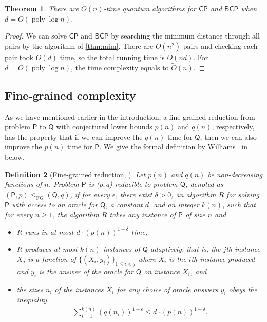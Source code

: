 \documentclass[10pt,a4paper]{article}
\newtheorem{theorem}{Theorem}
\newtheorem{definition}[theorem]{Definition}
\newcommand{\wt}{\widetilde}
\renewcommand{\tilde}{\wt}
\DeclareMathOperator{\poly}{poly}
\newcommand{\FG}{\mathrm{FG}}
\newcommand{\CP}{\ensuremath{\mathsf{CP}}}
\newcommand{\BCP}{\ensuremath{\mathsf{BCP}}}
\begin{document}
\begin{theorem}\label{cor:trivial_alg}
There are $\tilde{O}(n)$-time quantum algorithms for $\CP$ and $\BCP$ when $d=O(\poly\log n)$.
\end{theorem}
\begin{proof}
We can solve $\CP$ and $\BCP$ by searching the minimum distance through all pairs by the algorithm of \cref{thm:mim}. There are $O(n^2)$ pairs and checking each pair took $O(d)$ time, so the total running time is $O(nd)$. For $d=O(\poly\log n)$, the time complexity equals to $\tilde{O}(n)$.
\end{proof}

\subsection{Fine-grained complexity}

As we have mentioned earlier in the introduction, a fine-grained reduction from problem $\mathsf{P}$ to $\mathsf{Q}$ with conjectured lower bounds $p(n)$ and $q(n)$, respectively, has the property that if we can improve the $q(n)$ time for $\mathsf{Q}$, then we can also improve the $p(n)$ time for $\mathsf{P}$. We give the formal definition by Williams~\cite{r46} in below. 

\begin{definition}[Fine-grained reduction, \cite{r46}]\label{def:fg}
Let $p(n)$ and $q(n)$ be non-decreasing functions of $n$. Problem $\mathsf{P}$ is ($p,q$)-reducible to problem $\mathsf{Q}$, denoted as $(\mathsf{P},p)\leq_{\FG} (\mathsf{Q},q)$, if for every $\epsilon$, there exist $\delta>0$, an algorithm $R$ for solving $\mathsf{P}$ with access to an oracle for $\mathsf{Q}$, a constant $d$, and an integer $k(n)$, such that for every $n\ge 1$, the algorithm $R$ takes any instance of $\mathsf{P}$ of size $n$ and 
\begin{itemize}
    \item $R$ runs in at most $d\cdot (p(n))^{1-\delta}$-time, 
    \item $R$ produces at most $k(n)$ instances of $\mathsf{Q}$ adaptively, that is, the $j$th instance $X_j$ is a function of $\{(X_i,y_i)\}_{1\leq i<j}$ where $X_i$ is the $i$th instance produced and $y_i$ is the answer of the oracle for $\mathsf{Q}$ on instance $X_i$, and 
    \item the sizes $n_i$ of the instances $X_i$ for any choice of oracle answers $y_i$ obeys the inequality
    \begin{align}\label{eq:fgr}
        \sum_{i=1}^{k(n)} (q(n_i))^{1-\epsilon} \leq d\cdot (p(n))^{1-\delta}.
    \end{align}
\end{itemize}
\end{definition}
\end{document}
